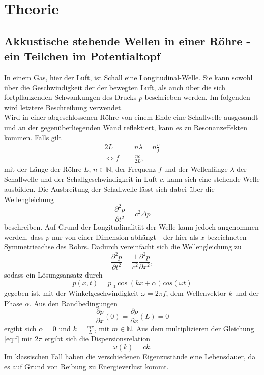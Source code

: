 \section{Theorie}
\label{sec:Theorie}

\subsection{Akkustische stehende Wellen in einer Röhre - ein Teilchen im Potentialtopf}
In einem Gas, hier der Luft, ist Schall eine Longitudinal-Welle. Sie kann sowohl über die Geschwindigkeit der der bewegten Luft, als auch über die sich fortpflanzenden Schwankungen des Drucks $p$ beschrieben werden. Im folgenden wird letztere Beschreibung verwendet.\\
Wird in einer abgeschlossenen Röhre von einem Ende eine Schallwelle ausgesandt und an der gegenüberliegenden Wand reflektiert, kann es zu Resonanzeffekten kommen. Falls gilt
\begin{align}
2L&=n\lambda=n\frac{c}{f}\\
\Leftrightarrow f&=\frac{n c}{2L},\label{eq:f}
\end{align}
mit der Länge der Röhre $L$, $n\in\mathbb{N}$, der Frequenz $f$ und der Wellenlänge $\lambda$ der Schallwelle und der Schallgeschwindigkeit in Luft $c$, kann sich eine stehende Welle ausbilden.
Die Ausbreitung der Schallwelle lässt sich dabei über die Wellengleichung
\begin{equation}
\frac{\partial^2 p}{\partial t^2}=c^2\Delta p\label{eq:WGL}
\end{equation}
beschreiben. Auf Grund der Longitudinalität der Welle kann jedoch angenommen werden, dass $p$ nur von einer Dimension abhängt - der hier als $x$ bezeichneten Symmetrieachse des Rohrs. Dadurch vereinfacht sich die Wellengleichung zu
\[
\frac{\partial^2 p}{\partial t^2}=\frac{1}{c^2}\frac{\partial^2 p}{\partial x^2},
\]
sodass ein Lösungsansatz durch
\[
p(x,t)=p_.0\cos(k x +\alpha)cos(\omega t)
\]
gegeben ist, mit der Winkelgeschwindigkeit $\omega=2\pi f$, dem Wellenvektor $k$ und der Phase $\alpha$. Aus den Randbedingungen 
\[
\frac{\partial p}{\partial x}(0)=\frac{\partial p}{\partial x}(L)=0
\]
ergibt sich $\alpha=0$ und $k=\frac{m\pi}{L}$, mit $m\in\mathbb{N}$.
Aus dem multiplizieren der Gleichung \eqref{eq:f} mit $2\pi$ ergibt sich die Dispersionsrelation
\begin{equation}
\omega(k)=c k\text{.}\label{eq:w_k}
\end{equation}
Im klassischen Fall haben die verschiedenen Eigenzustände eine Lebensdauer, da es auf Grund von Reibung zu Energieverlust kommt.
